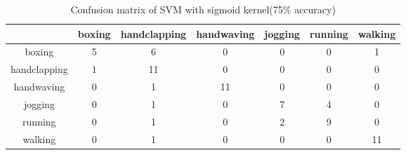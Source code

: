 \documentclass{article}
\begin{document}
\begin{table}
\caption{Confusion matrix of SVM with sigmoid kernel(75\% accuracy)}
\begin{center}
\begin{tabular}{c|cccccc}\hline
&boxing&handclapping &handwaving &jogging &running &walking\\ \hline
boxing&5& 6& 0& 0& 0& 1\\
handclapping&1& 11& 0& 0& 0& 0\\
handwaving&0& 1& 11&0 &0 &0 \\
jogging&0& 1& 0&7 &4 &0 \\
running&0& 1&0&2 &9 &0 \\
walking&0&1 &0 &0 &0 &11 \\ \hline
\end{tabular}
\end{center}
\end{table} 
\end{document}
